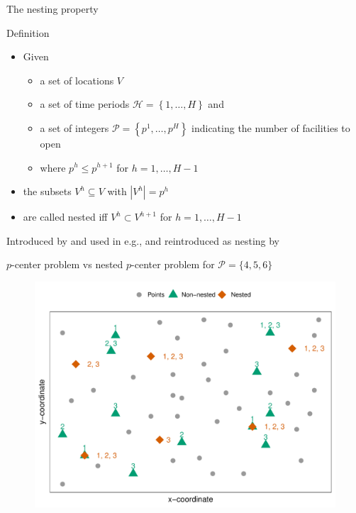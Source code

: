 \documentclass[utf8,aspectratio=169,ngerman,english]{beamer}
\renewcommand{\emph}[1]{\textcolor{jkuGreen}{#1}}
\begin{document}
\begin{frame}{The nesting property}
    \begin{block}{Definition}
        \begin{itemize}
            \item Given \pause
            \begin{itemize}
                \item a set of locations $V$
                \item a set of time periods $\mathcal{H} = \left\{1, \dots, H\right\}$ and \pause
                \item a set of integers $\mathcal P = \left\{p^1, \dots, p^H\right\}$ indicating the number of facilities to open \pause
                \item where $p^h \leq p^{h+1}$ for $h = 1, \dots, H-1$ \pause
            \end{itemize}
            \item the subsets $V^h \subseteq V$ with $|V^h| = p^h$ \pause
            \item are called \emph{nested} iff $V^h  \subset V^{h+1}$ for $h = 1, \dots, H-1$
        \end{itemize}
    \end{block}\pause
    Introduced by \cite{Roodman1975} and used in e.g., \cite{albareda2009multi,conforti2014integer,bakker2024value} and reintroduced as nesting by \cite{McGarvey2022}
\end{frame}

\begin{frame}{$p$-center problem vs nested $p$-center problem for $\mathcal P = \{4, 5, 6\}$}
    \centering
    \begin{figure}
        \includegraphics[width=0.55\linewidth]{images/Rplot01.pdf}
    \end{figure}
\end{frame}
\end{document}

